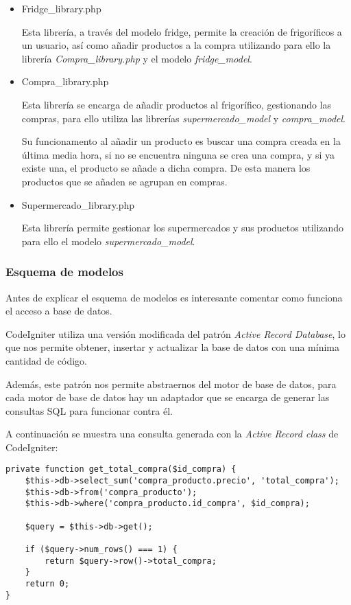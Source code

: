 \begin{itemize}
        \item Fridge\_library.php

            Esta librería, a través del modelo fridge, permite la creación de frigoríficos a un usuario, así como añadir productos a la compra utilizando para ello la librería \emph{Compra\_library.php} y el modelo \emph{fridge\_model}.

        \item Compra\_library.php

            Esta librería se encarga de añadir productos al frigorífico, gestionando las compras, para ello utiliza las librerías \emph{supermercado\_model} y \emph{compra\_model}.

            Su funcionamento al añadir un producto es buscar una compra creada en la última media hora, si no se encuentra ninguna se crea una compra, y si ya existe una, el producto se añade a dicha compra. De esta manera los productos que se añaden se agrupan en compras.

        \item Supermercado\_library.php

            Esta librería permite gestionar los supermercados y sus productos utilizando para ello el modelo \emph{supermercado\_model}.
    \end{itemize}

    \subsubsection{Esquema de modelos}

        Antes de explicar el esquema de modelos es interesante comentar como funciona el acceso a base de datos.

        CodeIgniter utiliza una versión modificada del patrón \emph{Active Record Database}, lo que nos permite obtener, insertar y actualizar la base de datos con una mínima cantidad de código.

        Además, este patrón nos permite abstraernos del motor de base de datos, para cada motor de base de datos hay un adaptador que se encarga de generar las consultas SQL para funcionar contra él.

        A continuación se muestra una consulta generada con la \emph{Active Record class} de CodeIgniter:

        \begin{lstlisting}
private function get_total_compra($id_compra) {
    $this->db->select_sum('compra_producto.precio', 'total_compra');
    $this->db->from('compra_producto');
    $this->db->where('compra_producto.id_compra', $id_compra);

    $query = $this->db->get();

    if ($query->num_rows() === 1) {
        return $query->row()->total_compra;
    }
    return 0;
}
        \end{lstlisting}

